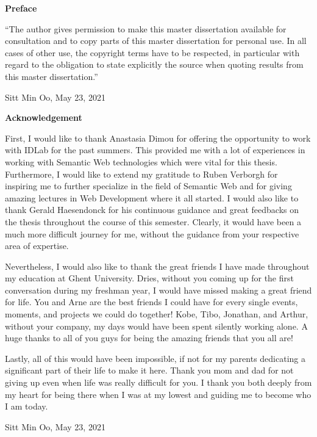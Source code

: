 
\newpage
{}
{}
\noindent \textbf{\huge Preface}

\vspace{1.5cm}

\noindent
``The author gives permission to make this master dissertation available for consultation and to copy parts
of this master dissertation for personal use. In all cases of other use, the copyright terms have to be respected,
in particular with regard to the obligation to state explicitly the source when quoting results from this master
dissertation.''

\vspace{1cm}

\noindent Sitt Min Oo, May 23, 2021 


\newpage
{}
{}
\noindent \textbf{\huge Acknowledgement}

\vspace{1.5cm}
First, I would like to thank Anastasia Dimou for offering the opportunity to 
work with IDLab for the past summers. This provided me with a lot of experiences 
in working with Semantic Web technologies which were vital for this 
thesis. Furthermore, I would like to extend my gratitude to Ruben Verborgh 
for inspiring me to further specialize in the field of Semantic Web and for giving amazing 
lectures in Web Development where it all started. I would also like to thank Gerald Haesendonck for 
his continuous guidance and great feedbacks on the thesis throughout the course of this semester. 
Clearly, it would have been a much more difficult journey for me, without the guidance from your 
respective area of expertise.

Nevertheless, I would also like to thank the great friends I have made throughout my education 
at Ghent University. Dries, without you coming up for the first conversation during my freshman year, I would 
have missed making a great friend for life. You and Arne are the best friends I could have for every single 
events, moments, and projects we could do together! Kobe, Tibo, Jonathan, and Arthur, without your company,  
my days would have been spent silently working alone. 
A huge thanks to all of you guys for being the amazing friends that you all are!  

Lastly, all of this would have been impossible, if not for my parents dedicating a significant part of 
their life to make it here. Thank you mom and dad for not giving up even when life was really difficult 
for you. 
I thank you both deeply from my heart for being there when I was at my lowest and guiding me to become 
who I am today. 

\vspace{1cm}
\noindent Sitt Min Oo, May 23, 2021 
